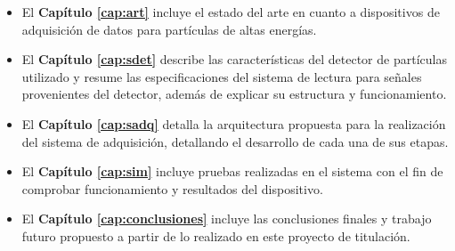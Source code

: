 	\begin{itemize}
		\item El \textbf{Capítulo \ref{cap:art}} incluye el estado del arte en cuanto a dispositivos de adquisición de datos para partículas de altas energías.
		\item El \textbf{Capítulo \ref{cap:sdet}} describe las características del detector de partículas utilizado y resume las especificaciones del sistema de lectura para señales provenientes del detector, además de explicar su estructura y funcionamiento.
		\item El \textbf{Capítulo \ref{cap:sadq}} detalla la arquitectura propuesta para la realización del sistema de adquisición, detallando el desarrollo de cada una de sus etapas.
		\item El \textbf{Capítulo \ref{cap:sim}} incluye pruebas realizadas en el sistema con el fin de comprobar funcionamiento y resultados del dispositivo.
		\item El \textbf{Capítulo \ref{cap:conclusiones}} incluye las conclusiones finales y trabajo futuro propuesto a partir de lo realizado en este proyecto de titulación.
	\end{itemize}

